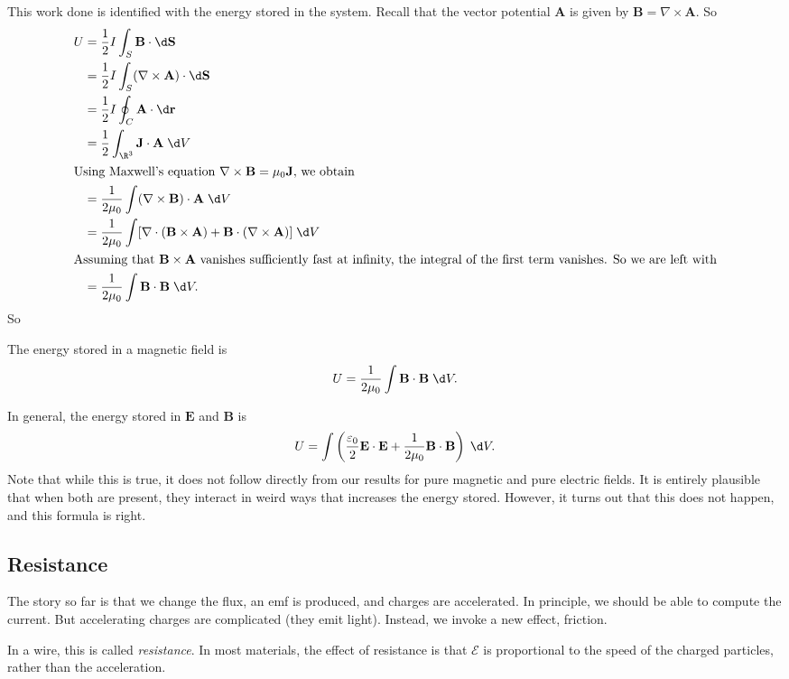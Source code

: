 \documentclass[a4paper]{article}
\begin{document}
This work done is identified with the energy stored in the system. Recall that the vector potential $\mathbf{A}$ is given by $\mathbf{B} = \nabla \times \mathbf{A}$. So
\begin{align*}
  U &= \frac{1}{2}I\int_S \mathbf{B}\cdot \d \mathbf{S}\\
  &= \frac{1}{2}I\int_S(\nabla\times \mathbf{A})\cdot \d \mathbf{S}\\
  &= \frac{1}{2}I\oint_C \mathbf{A}\cdot \d \mathbf{r}\\
  &= \frac{1}{2}\int_{\R^3} \mathbf{J}\cdot \mathbf{A}\;\d V\\
  \intertext{Using Maxwell's equation $\nabla\times \mathbf{B} = \mu_0 \mathbf{J}$, we obtain}
  &= \frac{1}{2\mu_0}\int (\nabla\times \mathbf{B})\cdot \mathbf{A}\;\d V\\
  &= \frac{1}{2\mu_0}\int[\nabla\cdot(\mathbf{B}\times \mathbf{A}) + \mathbf{B}\cdot (\nabla\times \mathbf{A})]\;\d V\\
  \intertext{Assuming that $\mathbf{B}\times \mathbf{A}$ vanishes sufficiently fast at infinity, the integral of the first term vanishes. So we are left with}
  &= \frac{1}{2\mu_0}\int \mathbf{B}\cdot \mathbf{B}\;\d V.
\end{align*}
So
\begin{prop}
  The energy stored in a magnetic field is
  \[
    U = \frac{1}{2\mu_0}\int \mathbf{B}\cdot \mathbf{B}\;\d V.
  \]
\end{prop}
In general, the energy stored in $\mathbf{E}$ and $\mathbf{B}$ is
\[
  U = \int \left(\frac{\varepsilon_0}{2}\mathbf{E}\cdot \mathbf{E} + \frac{1}{2\mu_0}\mathbf{B}\cdot \mathbf{B}\right)\;\d V.
\]
Note that while this is true, it does not follow directly from our results for pure magnetic and pure electric fields. It is entirely plausible that when both are present, they interact in weird ways that increases the energy stored. However, it turns out that this does not happen, and this formula is right.

\subsection{Resistance}
The story so far is that we change the flux, an emf is produced, and charges are accelerated. In principle, we should be able to compute the current. But accelerating charges are complicated (they emit light). Instead, we invoke a new effect, friction.

In a wire, this is called \emph{resistance}. In most materials, the effect of resistance is that $\mathcal{E}$ is proportional to the speed of the charged particles, rather than the acceleration.
\end{document}
